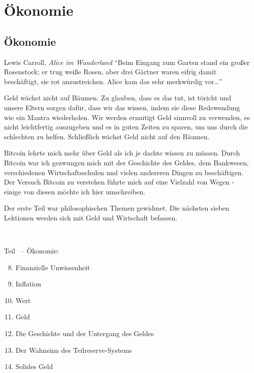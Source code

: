 \part{Ökonomie}
\label{ch:economics}
\chapter*{Ökonomie}

\begin{chapquote}{Lewis Carroll, \textit{Alice im Wunderland}}
\enquote{Beim Eingang zum Garten stand ein großer Rosenstock; er trug weiße
Rosen, aber drei Gärtner waren eifrig damit beschäftigt, sie rot anzustreichen.
Alice kam das sehr merkwürdig vor\ldots}
\end{chapquote}

Geld wächst nicht auf Bäumen. Zu glauben, dass es das tut, ist töricht und
unsere Eltern sorgen dafür, dass wir das wissen, indem sie diese Redewendung wie
ein Mantra wiederholen. Wir werden ermutigt Geld sinnvoll zu verwenden, es nicht
leichtfertig auszugeben und es in guten Zeiten zu sparen, um uns durch die
schlechten zu helfen. Schließlich wächst Geld nicht auf den Bäumen.

Bitcoin lehrte mich mehr über Geld als ich je dachte wissen zu müssen. Durch
Bitcoin war ich gezwungen mich mit der Geschichte des Geldes, dem Bankwesen,
verschiedenen Wirtschaftsschulen und vielen andereren Dingen zu beschäftigen.
Der Versuch Bitcoin zu verstehen führte mich auf eine Vielzahl von Wegen -
einige von diesen möchte ich hier umschreiben.

Der erste Teil war philosophischen Themen gewidmet. Die nächsten sieben
Lektionen werden sich mit Geld und Wirtschaft befassen.

~

\begin{samepage}
Teil~\ref{ch:economics} -- Ökonomie:

\begin{enumerate}
  \setcounter{enumi}{7}
  \item Finanzielle Unwissenheit
  \item Inflation
  \item Wert
  \item Geld
  \item Die Geschichte und der Untergang des Geldes
  \item Der Wahnsinn des Teilreserve-Systems
  \item Solides Geld
\end{enumerate}
\end{samepage}

